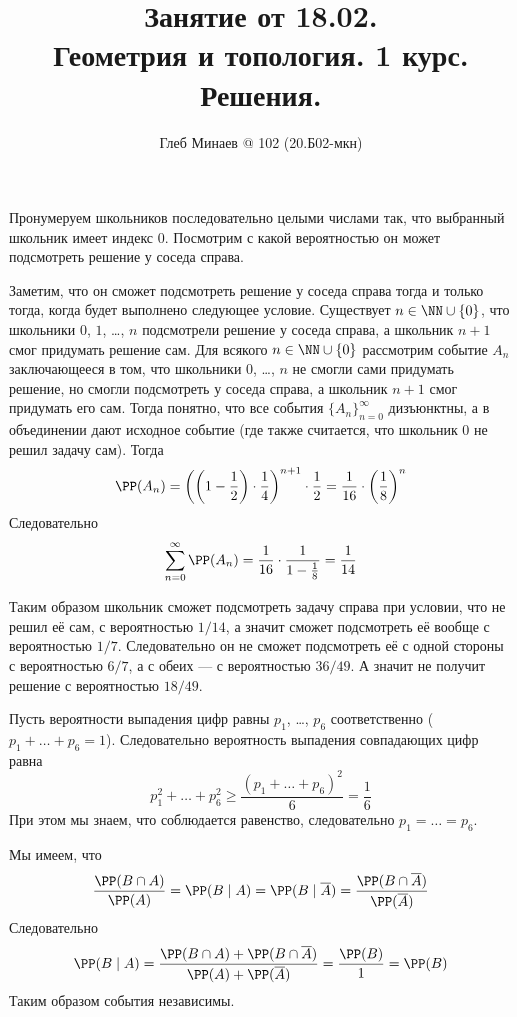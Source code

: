 \documentclass[12pt,a4paper]{article}
\title{Занятие от 18.02.\\Геометрия и топология. 1 курс.\\Решения.}
\author{Глеб Минаев @ 102 (20.Б02-мкн)}
\begin{document}
    \maketitle

    \begin{problem}{28}
        Пронумеруем школьников последовательно целыми числами так, что выбранный школьник имеет индекс $0$. Посмотрим с какой вероятностью он может подсмотреть решение у соседа справа.

        Заметим, что он сможет подсмотреть решение у соседа справа тогда и только тогда, когда будет выполнено следующее условие. Существует $n \in \NN \cup \{0\}$, что школьники $0$, $1$, \dots, $n$ подсмотрели решение у соседа справа, а школьник $n+1$ смог придумать решение сам. Для всякого $n \in \NN \cup \{0\}$ рассмотрим событие $A_n$ заключающееся в том, что школьники $0$, \dots, $n$ не смогли сами придумать решение, но смогли подсмотреть у соседа справа, а школьник $n+1$ смог придумать его сам. Тогда понятно, что все события $\{A_n\}_{n=0}^\infty$ дизъюнктны, а в объединении дают исходное событие (где также считается, что школьник $0$ не решил задачу сам). Тогда
        \[\PP(A_n) = \left(\left(1 - \frac{1}{2}\right) \cdot \frac{1}{4}\right)^{n+1} \cdot \frac{1}{2} = \frac{1}{16} \cdot \left(\frac{1}{8}\right)^n\]
        Следовательно
        \[\sum_{n=0}^\infty \PP(A_n) = \frac{1}{16} \cdot \frac{1}{1 - \frac{1}{8}} = \frac{1}{14}\]

        Таким образом школьник сможет подсмотреть задачу справа при условии, что не решил её сам, с вероятностью $1/14$, а значит сможет подсмотреть её вообще с вероятностью $1/7$. Следовательно он не сможет подсмотреть её с одной стороны с вероятностью $6/7$, а с обеих --- с вероятностью $36/49$. А значит не получит решение с вероятностью $18/49$.
    \end{problem}

    \begin{problem}{29}
        Пусть вероятности выпадения цифр равны $p_1$, \dots, $p_6$ соответственно ($p_1 + \dots + p_6 = 1$). Следовательно вероятность выпадения совпадающих цифр равна
        \[p_1^2 + \dots + p_6^2 \geqslant \frac{(p_1 + \dots + p_6)^2}{6} = \frac{1}{6}\]
        При этом мы знаем, что соблюдается равенство, следовательно $p_1 = \dots = p_6$.
    \end{problem}

    \begin{problem}{13}
        Мы имеем, что
        \[\frac{\PP(B \cap A)}{\PP(A)} = \PP(B \mid A) = \PP(B \mid \overline{A}) = \frac{\PP(B \cap \overline{A})}{\PP(\overline{A})}\]
        Следовательно
        \[\PP(B \mid A) = \frac{\PP(B \cap A) + \PP(B \cap \overline{A})}{\PP(A) + \PP(\overline{A})} = \frac{\PP(B)}{1} = \PP(B)\]
        Таким образом события независимы.
    \end{problem}
\end{document}
